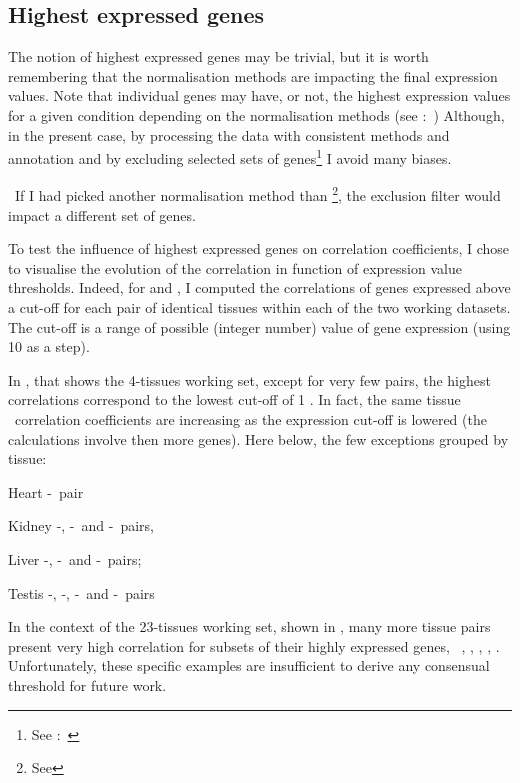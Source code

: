 \subsection{Highest expressed genes}

The notion of highest expressed genes may be trivial,
but it is worth remembering that the normalisation methods are impacting
the final expression values.
Note that individual genes may have, or not,
the highest expression values for a given condition
depending on the normalisation methods
(see :~)
Although, in the present case,
by processing the data with consistent methods and annotation
and by excluding selected sets of
genes\footnote{See :~}
I avoid many biases.

\NB\ If I had picked another normalisation method than \FPKM\footnote{See
},
the exclusion filter would impact a different set of genes.

To test the influence of highest expressed genes on correlation coefficients,
I chose to visualise the evolution of the correlation
in function of expression value thresholds.
Indeed, for  and ,
I computed the correlations of genes expressed above a cut-off
for each pair of identical tissues within each of the two working datasets.
The cut-off is a range of possible (integer number) value of gene expression
(using 10 as a step).

In , that shows the 4-tissues working set,
except for very few pairs, the highest correlations correspond to
the lowest cut-off of 1 \FPKM\@.
In fact, the same tissue \trep\ correlation coefficients
are increasing as the expression cut-off is lowered
(the calculations involve then more genes).
Here below, the few exceptions grouped by tissue:
\begin{eqlist}
\item[Heart] \uhlen{}-\gtex\ pair
\item[Kidney] \uhlen{}-\gtex, \castle{}-\uhlen\ and \castle{}-\gtex\ pairs,
\item[Liver]  \vt{}-\ibm, \ibm{}-\uhlen\ and \ibm{}-\uhlen\ pairs;
\item[Testis] \ibm{}-\uhlen, \vt{}-\gtex, \vt{}-\uhlen\ and \uhlen{}-\gtex\ pairs
\end{eqlist}

In the context of the 23-tissues working set,
shown in ,
many more tissue pairs present very high correlation for subsets of their highly
expressed genes, \ie\ \skeletal, \Thyroid, \Cortex, \Uterus, \Kidney.
Unfortunately, these specific examples are insufficient
to derive any consensual threshold for future work.

